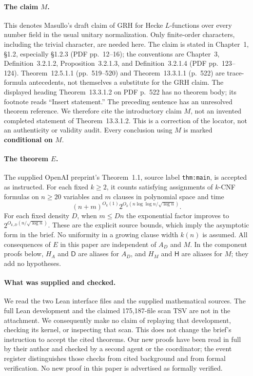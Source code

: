\paragraph{The claim $M$.}
This denotes Masullo's draft claim \cite{Masullo2026} of GRH for Hecke $L$-functions over every
number field in the usual unitary normalization.  Only finite-order characters,
including the trivial character, are needed here.  The claim is stated in
Chapter~1, \S1.2, especially \S1.2.3 (PDF pp.~12--16);
the conventions are Chapter~3, Definition~3.2.1.2,
Proposition~3.2.1.3, and Definition~3.2.1.4 (PDF pp.~123--124).
Theorem~12.5.1.1 (pp.~519--520) and Theorem~13.3.1.1 (p.~522) are
trace-formula antecedents, not themselves a substitute for the GRH claim.
The displayed heading Theorem~13.3.1.2 on PDF p.~522 has no theorem body;
its footnote reads ``Insert statement.''  The preceding sentence has an
unresolved theorem reference.  We therefore cite the introductory claim $M$,
not an invented completed statement of Theorem~13.3.1.2.
This is a correction of the locator, not an authenticity or validity audit.
Every conclusion using $M$ is marked \textbf{conditional on $M$}.

\paragraph{The theorem $E$.}
The supplied OpenAI preprint's Theorem~1.1, source label
\texttt{thm:main}, is accepted as instructed.  For each fixed $k\geq2$, it
counts satisfying assignments of $k$-CNF formulas on $n\geq20$ variables and
$m$ clauses in polynomial space and time
\[
 (n+m)^{O_k(1)}
 2^{O_k(n\log\log n/\sqrt{\log n})}.
\]
For each fixed density $D$, when $m\leq Dn$ the exponential factor improves
to $2^{O_{k,D}(n/\sqrt{\log n})}$.  These are the explicit source bounds,
which imply the asymptotic form in the brief.  No uniformity in a growing
clause width $k(n)$ is assumed.  All consequences of $E$ in this paper are
independent of $A_D$ and $M$.  In the component proofs below,
$H_A$ and $\mathsf D$ are aliases for $A_D$, and $H_M$ and
$\mathsf H$ are aliases for $M$; they add no hypotheses.

\paragraph{What was supplied and checked.}
We read the two Lean interface files and the supplied mathematical sources.
The full Lean development and the claimed 175,187-file scan TSV are not in
the attachment.  We consequently make no claim of replaying that development,
checking its kernel, or inspecting that scan.  This does not change the
brief's instruction to accept the cited theorems.  Our new proofs have been
read in full by their author and checked by a second agent or the coordinator;
the event register distinguishes those checks from cited background and
from formal verification.  No new proof in this paper is advertised as
formally verified.

